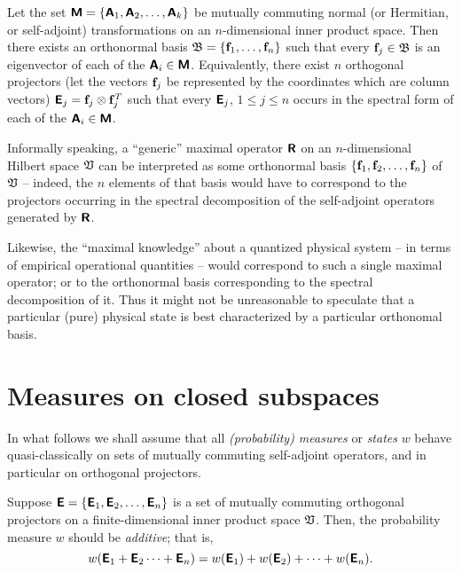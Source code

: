 Let the set $\textsf{\textbf{M}}
=
\{
\textsf{\textbf{A}}_1,
\textsf{\textbf{A}}_2,
\ldots ,
\textsf{\textbf{A}}_k
\}
$
be mutually commuting  normal (or Hermitian, or self-adjoint) transformations on an $n$-dimensional inner product space.
Then there exists an orthonormal basis
${\frak B}= \{
{\bf f}_1,
\ldots ,
{\bf f}_n\}$
such that every ${\bf f}_j \in {\frak B}$  is an eigenvector  of each of the $\textsf{\textbf{A}}_i \in  \textsf{\textbf{M}}$.
Equivalently, there exist $n$ orthogonal projectors  (let the vectors ${\bf f}_j$ be represented by the coordinates which are column vectors)
$\textsf{\textbf{E}}_j= {\bf f}_j\otimes {\bf f}_j^T$
such that every $\textsf{\textbf{E}}_j$, $1\le j\le n$ occurs in the spectral form of each of the $\textsf{\textbf{A}}_i \in  \textsf{\textbf{M}}$.


Informally speaking,
a ``generic'' maximal operator $\textsf{\textbf{R}}$ on an $n$-dimensional Hilbert space ${\frak V}$
can be interpreted as some orthonormal basis
$\{{\bf f}_1,{\bf f}_2,\ldots ,{\bf f}_n\}$ of ${\frak V}$
-- indeed, the $n$ elements of that basis would have to correspond to the projectors occurring
in the spectral decomposition of the self-adjoint operators
generated by $\textsf{\textbf{R}}$.

{\color{Purple}
Likewise, the ``maximal knowledge'' about a quantized physical system -- in terms of empirical operational quantities --
would correspond to such a single maximal operator;
or to the orthonormal basis corresponding to the spectral decomposition of it.
Thus it might not be unreasonable to speculate that a particular (pure) physical state is best characterized by a particular orthonomal basis.
}


\section{Measures on closed subspaces}

In what follows we shall assume that all {\em (probability) measures}
or {\em states} $w$
behave quasi-classically on sets of mutually commuting self-adjoint operators,
and in particular on orthogonal projectors.

Suppose
 $\textsf{\textbf{E}}
=
\{
\textsf{\textbf{E}}_1,
\textsf{\textbf{E}}_2,
\ldots ,
\textsf{\textbf{E}}_n
\}
$
is a set of mutually commuting orthogonal projectors
on a finite-dimensional inner product space   ${\frak V}$.
Then, the probability measure $w$ should be {\em additive}; that is,
\begin{equation}
w(\textsf{\textbf{E}}_1+\textsf{\textbf{E}}_2\cdots +\textsf{\textbf{E}}_n)=
w(\textsf{\textbf{E}}_1)+
w(\textsf{\textbf{E}}_2)+
\cdots +
w(\textsf{\textbf{E}}_n).
\end{equation}

